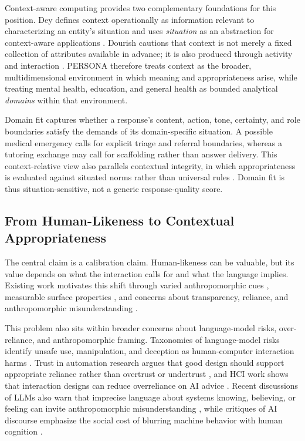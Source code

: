 \documentclass[manuscript,review,anonymous]{acmart}
\begin{document}
Context-aware computing provides two complementary foundations for this position. Dey defines context operationally as information relevant to characterizing an entity's situation and uses \emph{situation} as an abstraction for context-aware applications \cite{dey2001}. Dourish cautions that context is not merely a fixed collection of attributes available in advance; it is also produced through activity and interaction \cite{dourish2004}. PERSONA therefore treats context as the broader, multidimensional environment in which meaning and appropriateness arise, while treating mental health, education, and general health as bounded analytical \emph{domains} within that environment.

Domain fit captures whether a response's content, action, tone, certainty, and role boundaries satisfy the demands of its domain-specific situation. A possible medical emergency calls for explicit triage and referral boundaries, whereas a tutoring exchange may call for scaffolding rather than answer delivery. This context-relative view also parallels contextual integrity, in which appropriateness is evaluated against situated norms rather than universal rules \cite{nissenbaum2004}. Domain fit is thus situation-sensitive, not a generic response-quality score.

\subsection{From Human-Likeness to Contextual Appropriateness}

The central claim is a calibration claim. Human-likeness can be valuable, but its value depends on what the interaction calls for and what the language implies. Existing work motivates this shift through varied anthropomorphic cues \cite{devrio2025}, measurable surface properties \cite{cheng2025}, and concerns about transparency, reliance, and anthropomorphic misunderstanding \cite{abercrombie2023,leong2019,sharkey2021}.

This problem also sits within broader concerns about language-model risks, over-reliance, and anthropomorphic framing. Taxonomies of language-model risks identify unsafe use, manipulation, and deception as human-computer interaction harms \cite{Weidinger2022Risks}. Trust in automation research argues that good design should support appropriate reliance rather than overtrust or undertrust \cite{lee2004}, and HCI work shows that interaction designs can reduce overreliance on AI advice \cite{Bucinca2021CognitiveForcing}. Recent discussions of LLMs also warn that imprecise language about systems knowing, believing, or feeling can invite anthropomorphic misunderstanding \cite{Shanahan2024Talking}, while critiques of AI discourse emphasize the social cost of blurring machine behavior with human cognition \cite{bender2024}.
\end{document}
